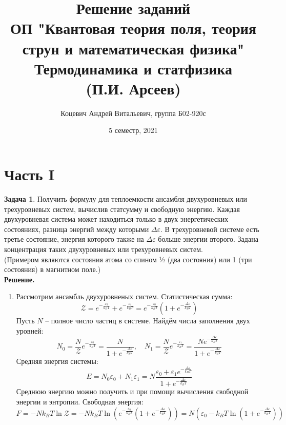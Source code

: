 \documentclass[12pt]{article}
\title{Решение заданий\\ ОП "Квантовая теория поля, теория струн и математическая физика"\\[2cm]
Термодинамика и статфизика\\ (П.И. Арсеев)}
\author{Коцевич Андрей Витальевич, группа Б02-920с}
\date{5 семестр, 2021}
\theoremstyle{definition}
\newtheorem{zad}{Задача}[section]
\begin{document}
\maketitle
\newpage
\section{Часть I}
\begin{zad}
Получить формулу для теплоемкости ансамбля двухуровневых или трехуровневых систем, вычислив статсумму и свободную энергию. Каждая двухуровневая система может находиться только в двух энергетических состояниях, разница энергий между которыми $\Delta\varepsilon$. В трехуровневой системе есть третье состояние, энергия которого также на $\Delta\varepsilon$ больше энергии второго. Задана концентрация таких двухуровневых или трехуровневых систем.\\
(Примером являются состояния атома со спином 1⁄2 (два состояния) или 1 (три состояния) в магнитном поле.)\\
\textbf{Решение.}
\begin{enumerate}
    \item Рассмотрим ансамбль двухуровненых систем. Статистическая сумма:
    \begin{equation}
        \mathcal{Z}=e^{-\frac{\varepsilon_0}{k_BT}}+e^{-\frac{\varepsilon_1}{k_BT}}=e^{-\frac{\varepsilon_0    }{k_BT}}\left(1+e^{-\frac{\Delta\varepsilon}{k_BT}}\right)
    \end{equation}
    Пусть $N$ -- полное число частиц в системе. Найдём числа заполнения     двух уровней:
    \begin{equation}
        N_0=\frac{N}{\mathcal{Z}}e^{-\frac{\varepsilon_0}{k_BT}}=\frac{N}{1+e^{-\frac{\Delta\varepsilon}{k_BT}}},\quad     N_1=\frac{N}{\mathcal{Z}}e^{-\frac{\varepsilon_1}{k_BT}}=\frac{Ne^{-\frac{\Delta\varepsilon}{k_BT}}}{1+e^{-\frac{\Delta\varepsilon}{k_BT}}}
    \end{equation}
    Средняя энергия системы:
    \begin{equation}
        E=N_0\varepsilon_0+N_1\varepsilon_1=N\frac{\varepsilon_0+\varepsilon_1e^{-\frac{\Delta\varepsilon}{k_BT}}}{1+e^{-\frac{\Delta\varepsilon}{k_BT}}}
    \end{equation}
    Среднюю энергию можно получить и при помощи вычисления свободной энергии и энтропии. Свободная энергия:
    \begin{equation}
        F=-Nk_BT\ln\mathcal{Z}=-Nk_BT\ln\left(e^{-\frac{\varepsilon_0}{k_BT}}\left(1+e^{-\frac{\Delta\varepsilon}{k_BT}}\right)\right)=N\left(\varepsilon_0-k_BT\ln\left(1+e^{-\frac{\Delta\varepsilon}{k_BT}}\right)\right)

\end{equation}
\end{enumerate}
\end{zad}
\end{document}
